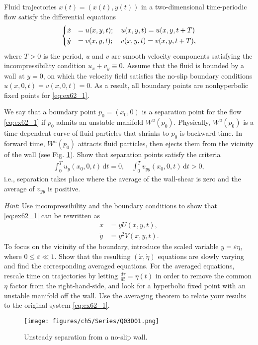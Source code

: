 \begin{exercise}
Fluid trajectories ${x}(t) = (x(t),y(t))$ in a two-dimensional time-periodic flow satisfy the differential equations
\begin{align}
	\begin{dcases}
		\dot{x} &= u(x,y,t); \quad u(x,y,t) = u(x,y,t+T) \\
		\dot{y} &= v(x,y,t); \quad v(x,y,t) = v(x,y,t+T),
	\end{dcases}
	\label{eq:ex62_1}
\end{align}
where $T>0$ is the period, $u$ and $v$ are smooth velocity components satisfying the incompressibility condition $u_x + v_y \equiv 0$. Assume that the fluid is bounded by a wall at $y=0$, on which the velocity field satisfies the no-slip boundary conditions $u(x,0,t) = v(x,0,t)=0$. As a result, all boundary points are nonhyperbolic fixed points for \eqref{eq:ex62_1}.

We say that a boundary point ${p}_0 = (x_0,0)$ is a separation point for the flow \eqref{eq:ex62_1} if ${p}_0$ admits an unstable manifold $W^u({p}_0)$. Physically, $W^u({p}_0)$ is a time-dependent curve of fluid particles that shrinks to ${p}_0$ is backward time. In forward time, $W^u({p}_0)$ attracts fluid particles, then ejects them from the vicinity of the wall (see Fig. \ref{fig:ex62_1}). Show that separation points satisfy the criteria
\begin{align}
	\int_0^T u_y(x_0,0,t) \, \text{d}t = 0, \quad \int_0^T v_{yy}(x_0,0,t)\, \text{d}t > 0,
\end{align}
i.e., separation takes place where the average of the wall-shear is zero and the average of $v_{yy}$ is positive.

\textit{Hint}: Use incompressibility and the boundary conditions to show that \eqref{eq:ex62_1} can be rewritten as
\begin{align}
	\dot{x} &= yU(x,y,t), \\
	\dot{y} &= y^2V(x,y,t).
\end{align}
To focus on the vicinity of the boundary, introduce the scaled variable $y=\varepsilon \eta$, where $0 \leq \varepsilon \ll 1$. Show that the resulting $(\dot{x},\dot{\eta})$ equations are slowly varying and find the corresponding averaged equations. For the averaged equations, rescale time on trajectories by letting $\frac{d\tau}{dt} = \eta(t)$ in order to remove the common $\eta$ factor from the right-hand-side, and look for a hyperbolic fixed point with an unstable manifold off the wall. Use the averaging theorem to relate your results to the original system \eqref{eq:ex62_1}.

\begin{figure}[h]
	\centering
	\texttt{[image: figures/ch5/Series/Q03D01.png]}
	\label{fig:ex62_1}
	\caption{Unsteady separation from a no-slip wall.}
\end{figure}
\end{exercise}


